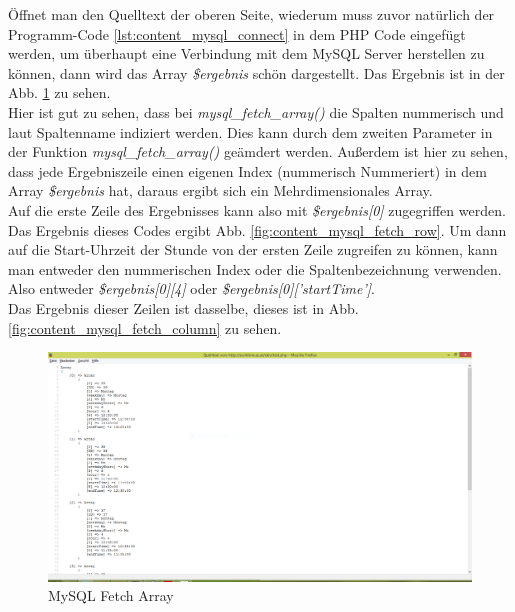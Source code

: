 Öffnet man den Quelltext der oberen Seite, wiederum muss zuvor natürlich der Programm-Code \ref{lst:content_mysql_connect} in dem PHP Code eingefügt werden, um überhaupt eine Verbindung mit dem MySQL Server herstellen zu können, dann wird das Array \textit{\$ergebnis} schön dargestellt. Das Ergebnis ist in der Abb. \ref{fig:content_mysql_fetch_array} zu sehen.\\
Hier ist gut zu sehen, dass bei \textit{mysql\_fetch\_array()} die Spalten nummerisch und laut Spaltenname indiziert werden. Dies kann durch dem zweiten Parameter in der Funktion \textit{mysql\_fetch\_array()} geämdert werden. Außerdem ist hier zu sehen, dass jede Ergebniszeile einen eigenen Index (nummerisch Nummeriert) in dem Array \textit{\$ergebnis} hat, daraus ergibt sich ein Mehrdimensionales Array.\\
Auf die erste Zeile des Ergebnisses kann also mit \textit{\$ergebnis[0]} zugegriffen werden. Das Ergebnis dieses Codes ergibt Abb. \ref{fig:content_mysql_fetch_row}. Um dann auf die Start-Uhrzeit der Stunde von der ersten Zeile zugreifen zu können, kann man entweder den nummerischen Index oder die Spaltenbezeichnung verwenden. Also entweder \textit{\$ergebnis[0][4]} oder \textit{\$ergebnis[0]['startTime']}.\\ Das Ergebnis dieser Zeilen ist dasselbe, dieses ist in Abb. \ref{fig:content_mysql_fetch_column} zu sehen.\\
\begin{figure}[H]
\centering
\includegraphics[keepaspectratio=true, width=14cm]{images/screenshots/content_mysql_fetch_array.png}
\caption{MySQL Fetch Array}
\label{fig:content_mysql_fetch_array}
\end{figure}
